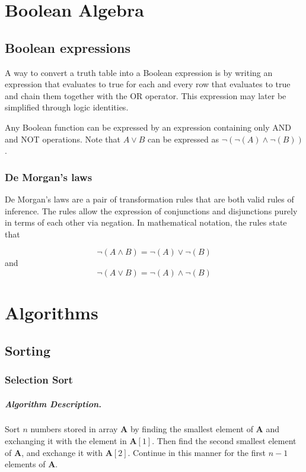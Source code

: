 \documentclass[oneside]{book} %
\theoremstyle{plain}
\begin{document}
\chapter{Boolean Algebra}
\section{Boolean expressions}
A way to convert a truth table into a Boolean expression is by writing an
expression that evaluates to true for each and every row that evaluates to true
and chain them together with the OR operator. This expression may later be
simplified through logic identities.

Any Boolean function can be expressed by an expression containing only AND and
NOT operations. Note that \(A \lor B\) can be expressed as \(\lnot \left( \lnot
\left( A \right) \land \lnot \left( B \right) \right)\).

\subsection{De Morgan's laws}
De Morgan's laws are a pair of transformation rules that are both valid rules of
inference. The rules allow the expression of conjunctions and disjunctions
purely in terms of each other via negation. In mathematical notation, the rules
state that

\[\lnot \left( A \land B \right) =
  \lnot \left( A \right) \lor \lnot \left( B \right)\]
and
\[\lnot \left( A \lor B \right) =
  \lnot \left( A \right) \land \lnot \left( B \right)\]

\chapter{Algorithms}

\section{Sorting}
\subsection{Selection Sort}
\paragraph{Algorithm Description.} Sort \(n\) numbers stored in array
\(\mathbf{A}\) by finding the smallest element of \(\mathbf{A}\) and exchanging
it with the element in \(\mathbf{A}[1]\). Then find the second smallest element
of \(\mathbf{A}\), and exchange it with \(\mathbf{A}[2]\). Continue in this
manner for the first \(n - 1\) elements of \(\mathbf{A}\).
\end{document}
